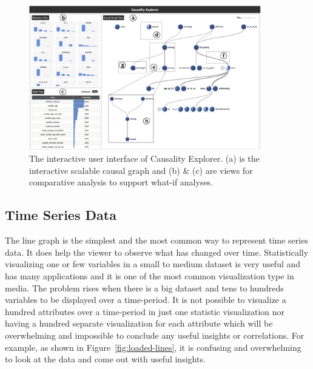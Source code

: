 \begin{figure}[H]
\centering
\captionsetup{justification=centering}
\includegraphics[width=0.9\textwidth]{Report-latex/tex_files/pics/cas.png}
\caption{The interactive user interface of Causality Explorer\cite{dua2017uci}. (a) is the interactive scalable causal graph and (b) \& (c) are views for comparative analysis to support what-if analyses.}
\label{fig:cas}
\end{figure}



\subsection{Time Series Data}

The line graph is the simplest and the most common way to represent time series data. It does help the viewer to observe what has changed over time. Statistically visualizing one or few variables in a small to medium dataset is very useful and has many applications and it is one of the most common visualization type in media. The problem rises when there is a big dataset and tens to hundreds variables to be displayed over a time-period. It is not possible to visualize a hundred attributes over a time-period in just one statistic visualization nor having a hundred separate visualization for each attribute which will be overwhelming and impossible to conclude any useful insights or correlations. For example, as shown in Figure~\ref{fig:loaded-lines}, it is confusing and overwhelming to look at the data and come out with useful insights.

